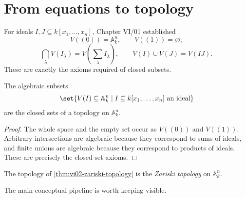 \section{From equations to topology}
\label{sec:vi02-equations-topology}

For ideals \(I,J\subseteq k[x_1,\dots,x_n]\), Chapter VI/01 established
\[
V((0))=\mathbb A_k^n,\qquad V((1))=\varnothing,
\]
\[
\bigcap_{\lambda}V(I_\lambda)
=V\!\left(\sum_\lambda I_\lambda\right),
\qquad
V(I)\cup V(J)=V(IJ).
\]
These are exactly the axioms required of closed subsets.

\begin{theorem}
\label{thm:vi02-zariski-topology}
The algebraic subsets
\[
\set{V(I)\subseteq\mathbb A_k^n\mid I\subseteq k[x_1,\dots,x_n]\text{ an ideal}}
\]
are the closed sets of a topology on \(\mathbb A_k^n\).
\end{theorem}

\begin{proof}
The whole space and the empty set occur as \(V((0))\) and \(V((1))\).  Arbitrary
intersections are algebraic because they correspond to sums of ideals, and finite unions
are algebraic because they correspond to products of ideals.  These are precisely the
closed-set axioms.
\end{proof}

\begin{definition}
The topology of \cref{thm:vi02-zariski-topology} is the \emph{Zariski topology} on
\(\mathbb A_k^n\).
\end{definition}

The main conceptual pipeline is worth keeping visible.

\begin{center}
\end{center}

